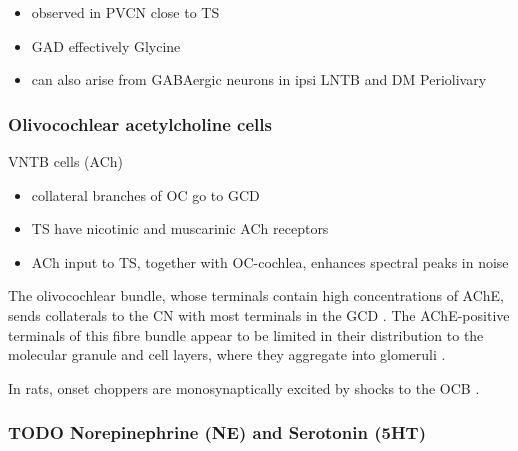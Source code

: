 \begin{itemize}
\item observed in PVCN close to TS \citep{AdamsMugnaini:1987}
\item GAD effectively Glycine \citep{GoldingOertel:1997}
\item can also arise from GABAergic neurons in ipsi LNTB and DM Periolivary
\end{itemize}


\subsubsection{Olivocochlear acetylcholine cells}

VNTB cells (ACh)

\begin{itemize}
\item collateral branches of OC go to GCD \citep{MellottMottsEtAl:2011,SherriffHenderson:1994,OsenRoth:1969}
\item TS have nicotinic and muscarinic ACh receptors \citep{FujinoOertel:2001}
\item ACh input to TS, together with OC-cochlea, enhances spectral peaks in noise  \citep{FujinoOertel:2001}
\end{itemize}

The olivocochlear bundle, whose terminals contain high concentrations of AChE, sends collaterals to the CN with most terminals in the GCD \citep{MellottMottsEtAl:2011,SherriffHenderson:1994,OsenRoth:1969}. %
The AChE-positive terminals of this fibre bundle appear to be limited in their distribution to the molecular granule and cell layers, where they aggregate into glomeruli \citep{OsenRoth:1969}.

In rats, onset choppers are monosynaptically excited by shocks to the OCB \citep{MuldersPaoliniEtAl:2003,MuldersWinterEtAl:2002,MuldersPaoliniEtAl:2009}.



\subsubsection{TODO  Norepinephrine (NE) and Serotonin (5HT)}

